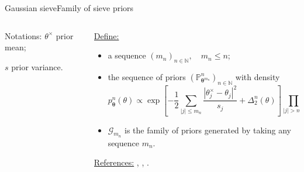 \documentclass[10pt]{beamer}
\begin{document}
\begin{frame}{Gaussian sieve}{Family of sieve priors}
\begin{columns}
\begin{column}[T]{.2\textwidth}%

\bigskip
\bigskip
\bigskip

\begin{block}{Notations:}
$\theta^{\times}$ prior mean;

\bigskip

$s$ prior variance.
\end{block}
\end{column}
\begin{column}[T]{.9\textwidth}%
\underline{Define:}
\begin{itemize}
\setlength\itemsep{2em}
\item a sequence $\left(m_{n}\right)_{n \in \mathbb{N}}, \quad m_{n} \leq n$;
\item the sequence of priors $\left(\mathbb{P}_{\boldsymbol{\theta}^{m_{n}}}^{n}\right)_{n \in \mathbb{N}}$ with density%
\[p_{\boldsymbol{\theta}}^{n}(\theta) \propto \exp\left[-\frac{1}{2} \sum\limits_{\vert j \vert \leq m_{n}}\frac{\left\vert \theta^{\times}_{j} - \theta_{j}\right\vert^{2}}{s_{j}} + \Delta_{2}^{n}(\theta)\right]\prod\limits_{\vert j \vert > m_{n}} \delta_{\theta^{\times}_{j}}(\theta_{j});\]
\item $\mathcal{G}_{m_{n}}$ is the family of priors generated by taking any sequence $m_{n}$.
\end{itemize}

\bigskip
\bigskip
\bigskip

\underline{References:} \textsc{\citet{castillo2008lower}}, \textsc{\citet{rasmussen2006gaussian}}, \textsc{\citet{JJASRS}}.
\end{column}
\end{columns}
\end{frame}
\end{document}
